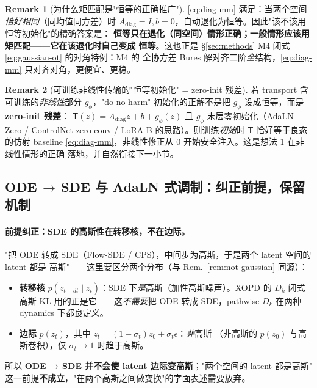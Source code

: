 \documentclass[11pt,a4paper]{article}
\newcommand{\Tmap}{\mathsf{T}}
\theoremstyle{definition}
\newtheorem{remark}{Remark}
\begin{document}
\begin{remark}[为什么矩匹配是"恒等的正确推广"]
\label{rem:mm-is-identity}
\eqref{eq:diag-mm} 满足：当两个空间\emph{恰好相同}（同均值同方差）时
$A_{\mathrm{diag}}=I,b=0$，自动退化为恒等。因此"该不该用恒等初始化"的精确答案是：
\textbf{恒等只在退化（同空间）情形正确；一般情形应该用矩匹配——它在该退化时自己变成
恒等}。这也正是 \S\ref{sec:methods} M4 闭式 \eqref{eq:gaussian-ot} 的对角特例：M4 的
全协方差 Bures 解对齐二阶\emph{全}结构，\eqref{eq:diag-mm} 只对齐对角，更便宜、更稳。
\end{remark}

\begin{remark}[可训练非线性传输的"恒等初始化" = zero-init 残差]
\label{rem:zero-init}
若 transport 含可训练的\emph{非线性}部分 $g_\phi$，"do no harm" 初始化的正解不是把
$g_\phi$ 设成恒等，而是 \textbf{zero-init 残差}：
$\Tmap(z)=A_{\mathrm{diag}}z+b+g_\phi(z)$ 且 $g_\phi$ 末层零初始化（AdaLN-Zero /
ControlNet zero-conv / LoRA-B 的思路）。则训练\emph{初始}时 $\Tmap$ 恰好等于良态的仿射
baseline \eqref{eq:diag-mm}，非线性修正从 0 开始安全注入。这是想法 1 在非线性情形的正确
落地，并自然衔接下一小节。
\end{remark}

\subsection[ODE to SDE 与 AdaLN 式调制]
{ODE\,$\to$\,SDE 与 AdaLN 式调制：纠正前提，保留机制}

\paragraph{前提纠正：SDE 的高斯性在转移核，不在边际。}
"把 ODE 转成 SDE（Flow-SDE / CPS），中间步为高斯，于是两个 latent 空间的 latent 都是
高斯"——这里要区分两个分布（与 Rem.~\ref{rem:not-gaussian} 同源）：
\begin{itemize}[leftmargin=1.5em]
\item \textbf{转移核} $p(z_{t+dt}\mid z_t)$：SDE 下\emph{是}高斯（加性高斯噪声）。XOPD 的
$D_k$ 闭式高斯 KL 用的正是它——这\emph{不需要}把 ODE 转成 SDE，pathwise $D_k$ 在两种
dynamics 下都良定义。
\item \textbf{边际} $p(z_t)$，其中 $z_t=(1-\sigma_t)z_0+\sigma_t\epsilon$：\emph{非}高斯
（非高斯的 $p(z_0)$ 与高斯卷积），仅 $\sigma_t\to1$ 时趋于高斯。
\end{itemize}
所以 \textbf{ODE\,$\to$\,SDE 并不会使 latent 边际变高斯}；"两个空间的 latent 都是高斯"
这一前提\textbf{不成立}，"在两个高斯之间做变换"的字面表述需要放弃。
\end{document}
